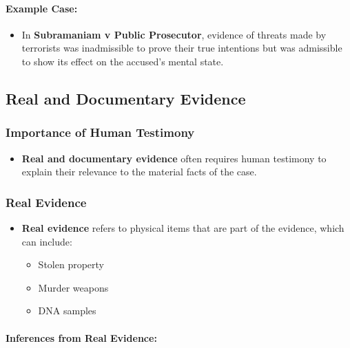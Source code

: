 \paragraph{Example Case:}\label{example-case-1}

\begin{itemize}
\tightlist
\item
  In \textbf{Subramaniam v Public Prosecutor}, evidence of threats made
  by terrorists was inadmissible to prove their true intentions but was
  admissible to show its effect on the accused's mental state.
\end{itemize}

\subsection{ Real and Documentary
Evidence}\label{real-and-documentary-evidence}

\subsubsection{Importance of Human
Testimony}\label{importance-of-human-testimony}

\begin{itemize}
\tightlist
\item
  \textbf{Real and documentary evidence} often requires human testimony
  to explain their relevance to the material facts of the case.
\end{itemize}

\subsubsection{Real Evidence}\label{real-evidence}

\begin{itemize}
\tightlist
\item
  \textbf{Real evidence} refers to physical items that are part of the
  evidence, which can include:

  \begin{itemize}
  \tightlist
  \item
    Stolen property
  \item
    Murder weapons
  \item
    DNA samples
  \end{itemize}
\end{itemize}

\paragraph{Inferences from Real
Evidence:}\label{inferences-from-real-evidence}

